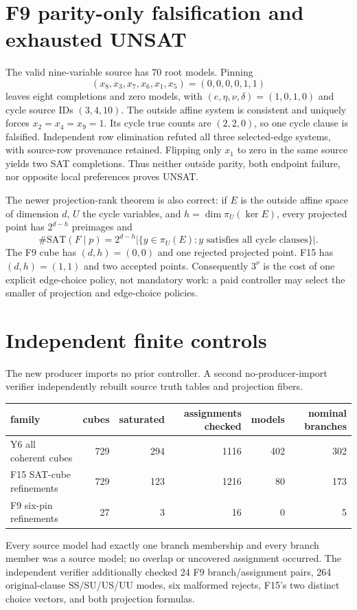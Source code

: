 \documentclass[11pt]{article}
\begin{document}
\section{F9 parity-only falsification and exhausted UNSAT}
The valid nine-variable source has 70 root models.  Pinning
\[
(x_8,x_3,x_7,x_6,x_1,x_5)=(0,0,0,0,1,1)
\]
leaves eight completions and zero models, with
$(e,\eta,\nu,\delta)=(1,0,1,0)$ and cycle source IDs $(3,4,10)$.
The outside affine system is consistent and uniquely forces
$x_2=x_4=x_9=1$.  Its cycle true counts are $(2,2,0)$, so one cycle clause is
falsified.  Independent row elimination refuted all three selected-edge
systems, with source-row provenance retained.  Flipping only $x_1$ to zero
in the same source yields two SAT completions.  Thus neither outside parity,
both endpoint failure, nor opposite local preferences proves UNSAT.

The newer projection-rank theorem is also correct: if $E$ is the outside
affine space of dimension $d$, $U$ the cycle variables, and
$h=\dim\pi_U(\ker E)$, every projected point has $2^{d-h}$ preimages and
\[
 \#\mathrm{SAT}(F\mid p)=2^{d-h}
 |\{y\in\pi_U(E):y\text{ satisfies all cycle clauses}\}|.
\]
The F9 cube has $(d,h)=(0,0)$ and one rejected projected point.  F15 has
$(d,h)=(1,1)$ and two accepted points.  Consequently $3^\nu$ is the cost of
one explicit edge-choice policy, not mandatory work: a paid controller may
select the smaller of projection and edge-choice policies.

\section{Independent finite controls}
The new producer imports no prior controller.  A second no-producer-import
verifier independently rebuilt source truth tables and projection fibers.
\begin{center}
\begin{tabular}{lrrrrr}\toprule
family&cubes&saturated&assignments checked&models&nominal branches\\\midrule
Y6 all coherent cubes&729&294&1116&402&302\\
F15 SAT-cube refinements&729&123&1216&80&173\\
F9 six-pin refinements&27&3&16&0&5\\\bottomrule
\end{tabular}
\end{center}
Every source model had exactly one branch membership and every branch member
was a source model; no overlap or uncovered assignment occurred.  The
independent verifier additionally checked 24 F9 branch/assignment pairs, 264
original-clause SS/SU/US/UU modes, six malformed rejects, F15's two distinct
choice vectors, and both projection formulas.
\end{document}
